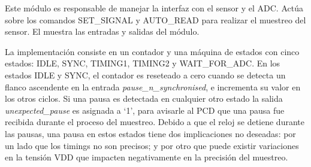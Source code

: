 \documentclass[a4paper, twoside, 11pt]{report}
\begin{document}
Este módulo es responsable de manejar la interfaz con el sensor y el ADC. Actúa sobre los comandos SET\_SIGNAL y AUTO\_READ para realizar el muestreo del sensor. El  muestra las entradas y salidas del módulo.

La implementación consiste en un contador y una máquina de estados con cinco estados: IDLE, SYNC, TIMING1, TIMING2 y WAIT\_FOR\_ADC. En los estados IDLE y SYNC, el contador es reseteado a cero cuando se detecta un flanco ascendente en la entrada \textit{pause\_n\_synchronised}, e incrementa su valor en los otros ciclos. Si una pausa es detectada en cualquier otro estado la salida \textit{unexpected\_pause} es asignada a ‘1’, para avisarle al PCD que una pausa fue recibida durante el proceso del muestreo. Debido a que el reloj se detiene durante las pausas, una pausa en estos estados tiene dos implicaciones no deseadas:  por un lado que los timings no son precisos; y por otro que puede existir variaciones en la tensión VDD que impacten negativamente en la precisión del muestreo.
\end{document}
